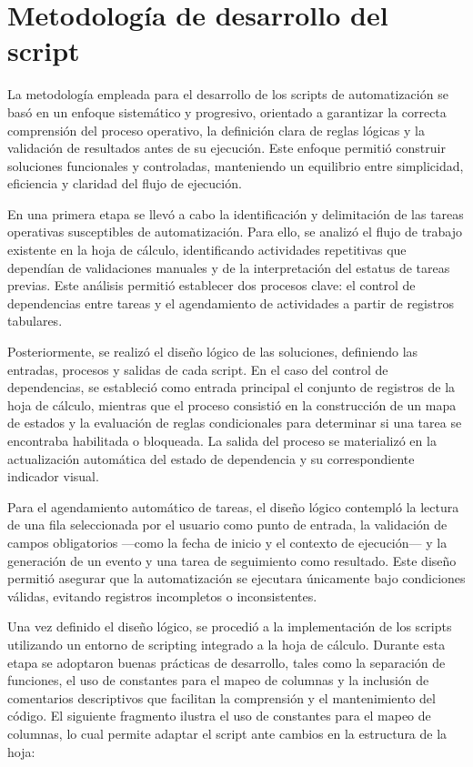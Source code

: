 \documentclass[12pt]{article}
\begin{document}
\section*{Metodología de desarrollo del script}

La metodología empleada para el desarrollo de los scripts de automatización se basó en un enfoque sistemático y progresivo, orientado a garantizar la correcta comprensión del proceso operativo, la definición clara de reglas lógicas y la validación de resultados antes de su ejecución. Este enfoque permitió construir soluciones funcionales y controladas, manteniendo un equilibrio entre simplicidad, eficiencia y claridad del flujo de ejecución.

En una primera etapa se llevó a cabo la identificación y delimitación de las tareas operativas susceptibles de automatización. Para ello, se analizó el flujo de trabajo existente en la hoja de cálculo, identificando actividades repetitivas que dependían de validaciones manuales y de la interpretación del estatus de tareas previas. Este análisis permitió establecer dos procesos clave: el control de dependencias entre tareas y el agendamiento de actividades a partir de registros tabulares.

Posteriormente, se realizó el diseño lógico de las soluciones, definiendo las entradas, procesos y salidas de cada script. En el caso del control de dependencias, se estableció como entrada principal el conjunto de registros de la hoja de cálculo, mientras que el proceso consistió en la construcción de un mapa de estados y la evaluación de reglas condicionales para determinar si una tarea se encontraba habilitada o bloqueada. La salida del proceso se materializó en la actualización automática del estado de dependencia y su correspondiente indicador visual.

Para el agendamiento automático de tareas, el diseño lógico contempló la lectura de una fila seleccionada por el usuario como punto de entrada, la validación de campos obligatorios —como la fecha de inicio y el contexto de ejecución— y la generación de un evento y una tarea de seguimiento como resultado. Este diseño permitió asegurar que la automatización se ejecutara únicamente bajo condiciones válidas, evitando registros incompletos o inconsistentes.

Una vez definido el diseño lógico, se procedió a la implementación de los scripts utilizando un entorno de scripting integrado a la hoja de cálculo. Durante esta etapa se adoptaron buenas prácticas de desarrollo, tales como la separación de funciones, el uso de constantes para el mapeo de columnas y la inclusión de comentarios descriptivos que facilitan la comprensión y el mantenimiento del código. El siguiente fragmento ilustra el uso de constantes para el mapeo de columnas, lo cual permite adaptar el script ante cambios en la estructura de la hoja:
\end{document}
